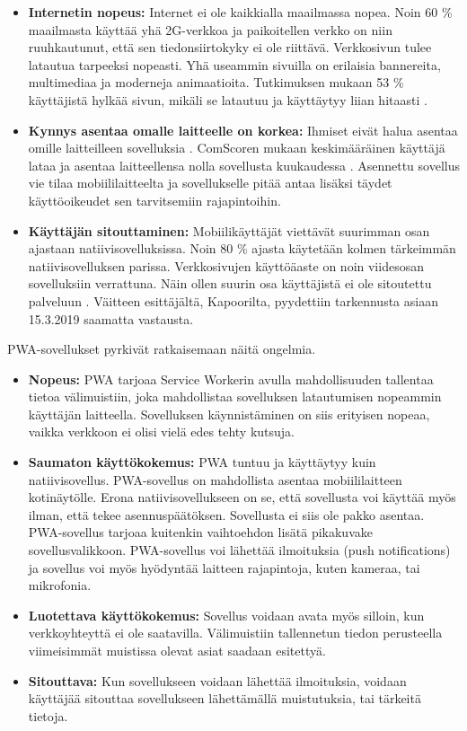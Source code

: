 \documentclass{tktltiki}
\begin{document}
\begin{itemize}
  \item \textbf{Internetin nopeus:} Internet ei ole kaikkialla maailmassa nopea. Noin 60 \% maailmasta käyttää yhä 2G-verkkoa \cite{Kapoor} ja paikoitellen verkko on niin ruuhkautunut, että sen tiedonsiirtokyky ei ole riittävä. Verkkosivun tulee latautua tarpeeksi nopeasti. Yhä useammin sivuilla on erilaisia bannereita, multimediaa ja moderneja animaatioita. Tutkimuksen mukaan 53 \% käyttäjistä hylkää sivun, mikäli se latautuu ja käyttäytyy liian hitaasti \cite{Kapoor}.
  \item \textbf{Kynnys asentaa omalle laitteelle on korkea:} Ihmiset eivät halua asentaa omille laitteilleen sovelluksia \cite{Kapoor}. ComScoren mukaan keskimääräinen käyttäjä lataa ja asentaa laitteellensa nolla sovellusta kuukaudessa \cite{Perez}. Asennettu sovellus vie tilaa mobiililaitteelta ja sovellukselle pitää antaa lisäksi täydet käyttöoikeudet sen tarvitsemiin rajapintoihin.
  \item \textbf{Käyttäjän sitouttaminen:} Mobiilikäyttäjät viettävät suurimman osan ajastaan natiivisovelluksissa. Noin 80 \% ajasta käytetään kolmen tärkeimmän natiivisovelluksen parissa. Verkkosivujen käyttöäaste on noin viidesosan sovelluksiin verrattuna. Näin ollen suurin osa käyttäjistä ei ole sitoutettu palveluun \cite{Kapoor}. Väitteen esittäjältä, Kapoorilta, pyydettiin tarkennusta asiaan 15.3.2019 saamatta vastausta.
\end{itemize}

PWA-sovellukset pyrkivät ratkaisemaan näitä ongelmia.

\begin{itemize}
  \item \textbf{Nopeus:} PWA tarjoaa Service Workerin avulla mahdollisuuden tallentaa tietoa välimuistiin, joka mahdollistaa sovelluksen latautumisen nopeammin käyttäjän laitteella. Sovelluksen käynnistäminen on siis erityisen nopeaa, vaikka verkkoon ei olisi vielä edes tehty kutsuja.
  \item \textbf{Saumaton käyttökokemus:} PWA tuntuu ja käyttäytyy kuin natiivisovellus. PWA-sovellus on mahdollista asentaa mobiililaitteen kotinäytölle. Erona natiivisovellukseen on se, että sovellusta voi käyttää myös ilman, että tekee asennuspäätöksen. Sovellusta ei siis ole pakko asentaa. PWA-sovellus tarjoaa kuitenkin vaihtoehdon lisätä pikakuvake sovellusvalikkoon. PWA-sovellus voi lähettää ilmoituksia (push notifications) ja sovellus voi myös hyödyntää laitteen rajapintoja, kuten kameraa, tai mikrofonia. 
  \item \textbf{Luotettava käyttökokemus:} Sovellus voidaan avata myös silloin, kun verkkoyhteyttä ei ole saatavilla. Välimuistiin tallennetun tiedon perusteella viimeisimmät muistissa olevat asiat saadaan esitettyä. 
  \item \textbf{Sitouttava:} Kun sovellukseen voidaan lähettää ilmoituksia, voidaan käyttäjää sitouttaa sovellukseen lähettämällä muistutuksia, tai tärkeitä tietoja. 
\end{itemize}
\end{document}
